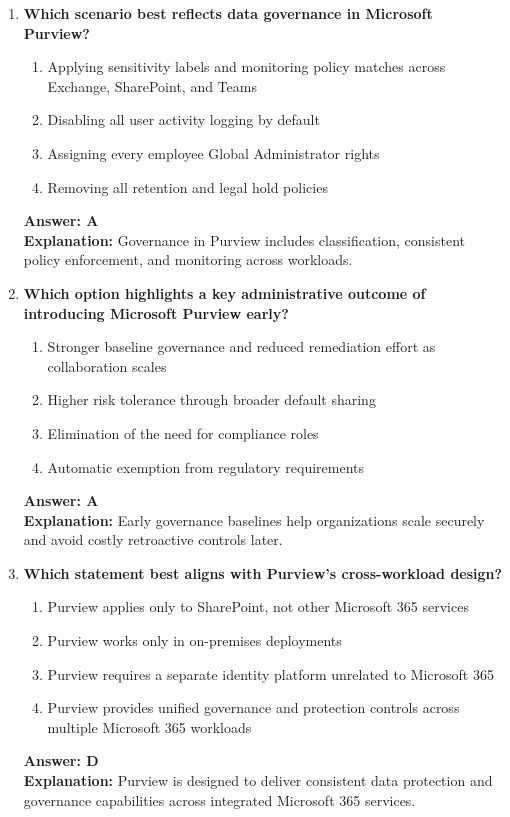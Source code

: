 \documentclass[10pt]{article}
\begin{document}
\begin{enumerate}[leftmargin=*]
\item \textbf{Which scenario best reflects data governance in Microsoft Purview?}
\begin{enumerate}[label=\Alph*.]
  \item Applying sensitivity labels and monitoring policy matches across Exchange, SharePoint, and Teams
  \item Disabling all user activity logging by default
  \item Assigning every employee Global Administrator rights
  \item Removing all retention and legal hold policies
\end{enumerate}
\textbf{Answer: A}\\
\textbf{Explanation:} Governance in Purview includes classification, consistent policy enforcement, and monitoring across workloads.

\item \textbf{Which option highlights a key administrative outcome of introducing Microsoft Purview early?}
\begin{enumerate}[label=\Alph*.]
  \item Stronger baseline governance and reduced remediation effort as collaboration scales
  \item Higher risk tolerance through broader default sharing
  \item Elimination of the need for compliance roles
  \item Automatic exemption from regulatory requirements
\end{enumerate}
\textbf{Answer: A}\\
\textbf{Explanation:} Early governance baselines help organizations scale securely and avoid costly retroactive controls later.

\item \textbf{Which statement best aligns with Purview's cross-workload design?}
\begin{enumerate}[label=\Alph*.]
  \item Purview applies only to SharePoint, not other Microsoft 365 services
  \item Purview works only in on-premises deployments
  \item Purview requires a separate identity platform unrelated to Microsoft 365
  \item Purview provides unified governance and protection controls across multiple Microsoft 365 workloads
\end{enumerate}
\textbf{Answer: D}\\
\textbf{Explanation:} Purview is designed to deliver consistent data protection and governance capabilities across integrated Microsoft 365 services.

\end{enumerate}
\clearpage
\end{document}
